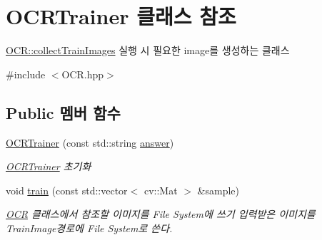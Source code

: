 \hypertarget{class_o_c_r_trainer}{}\section{O\+C\+R\+Trainer 클래스 참조}
\label{class_o_c_r_trainer}


\hyperlink{class_o_c_r_a9d4b78ff145b1e89ac05eb0f194d1948}{O\+C\+R\+::collect\+Train\+Images} 실행 시 필요한 image를 생성하는 클래스  




{\ttfamily \#include $<$O\+C\+R.\+hpp$>$}

\subsection*{Public 멤버 함수}
\begin{DoxyCompactItemize}
\item 
\hyperlink{class_o_c_r_trainer_abd29826f033646e6937bc07af133d599}{O\+C\+R\+Trainer} (const std\+::string \hyperlink{class_o_c_r_trainer_a8581e40fcbb646332572248938094b81}{answer})
\begin{DoxyCompactList}\small\item\em \hyperlink{class_o_c_r_trainer}{O\+C\+R\+Trainer} 초기화 \end{DoxyCompactList}\item 
\mbox{\label{class_o_c_r_trainer_a0c5b71ded13ee1ac8b135a9fd0ee140d}} 
void \hyperlink{class_o_c_r_trainer_a0c5b71ded13ee1ac8b135a9fd0ee140d}{train} (const std\+::vector$<$ cv\+::\+Mat $>$ \&sample)
\begin{DoxyCompactList}\small\item\em \hyperlink{class_o_c_r}{O\+CR} 클래스에서 참조할 이미지를 File System에 쓰기 입력받은 이미지를 \textquotesingle{}Train\+Image\textquotesingle{}경로에 File System로 쓴다. \end{DoxyCompactList}\end{DoxyCompactItemize}
